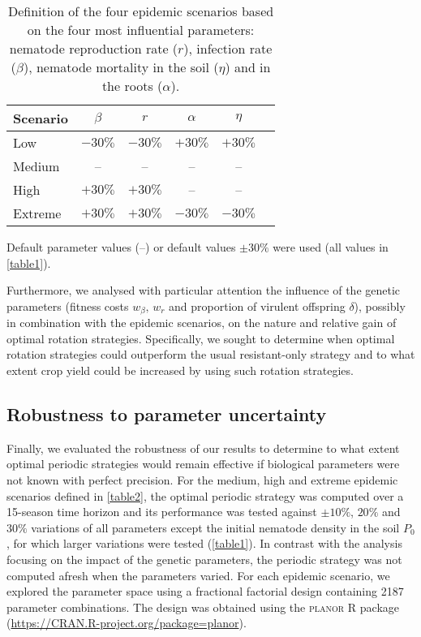 {{{{\begin{table}[ht]
  \centering
  \caption{Definition of the four epidemic scenarios based on the four most influential  parameters: nematode reproduction rate ($r$), infection rate ($\beta$), nematode mortality in the soil ($\eta$) and in the roots ($\alpha$).}
  \label{table2}
  \begin{tabular}{lccccc}
    \hline
    Scenario & $\beta$ & $r$     & $\alpha$ & $\eta$  \\
    \hline
    Low      & $-30\%$ & $-30\%$ & $+30\%$  & $+30\%$ \\
    Medium   & --      & --      & --       &  --     \\
    High     & $+30\%$ & $+30\%$ & --       &  --     \\
    Extreme  & $+30\%$ & $+30\%$ & $-30\%$  & $-30\%$ \\
    \hline
  \end{tabular}
  \par\medskip\footnotesize
  Default parameter values (--) or default values $\pm 30\%$ were used (all values in \autoref{table1}).
\end{table}

Furthermore, we analysed with particular attention the influence of the genetic
parameters (fitness costs $w_{\beta},\,w_{r}$ and proportion of
virulent offspring $\delta$), possibly in combination with the
 epidemic scenarios, on the nature and  relative gain
of optimal rotation strategies. Specifically, we sought to determine
when optimal rotation strategies could outperform the usual
resistant-only strategy and to what extent crop yield could be
increased by using such rotation strategies.

\subsection{Robustness to parameter uncertainty}

Finally, we evaluated the robustness of our results to determine to
what extent optimal periodic strategies would remain effective if
biological parameters were not known with perfect precision. For the
medium, high and extreme epidemic scenarios defined in
\autoref{table2}, the optimal periodic strategy was computed over a
15-season time horizon and its performance was tested against
$\pm 10\%$, $20\%$ and $30\%$ variations of all parameters except the
initial nematode density in the soil $P_0$, for which larger
variations were tested (\autoref{table1}). In contrast with the
analysis focusing on the impact of the genetic parameters, the
periodic strategy was not computed afresh when the parameters
varied. For each epidemic scenario, we explored the parameter space
using a fractional factorial design containing 2187 parameter
combinations. The design was obtained using the \textsc{planor} R
package
(\href{https://CRAN.R-project.org/package=planor}{https://CRAN.R-project.org/package=planor}).


}}}}
